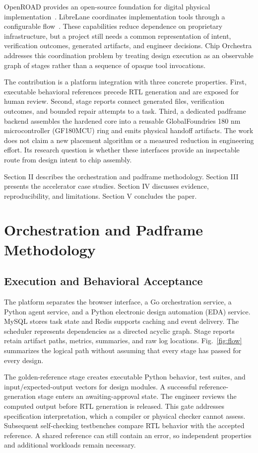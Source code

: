 ﻿\documentclass[conference,letterpaper]{IEEEtran}
\begin{document}
OpenROAD provides an open-source foundation for digital physical implementation~\cite{openroad}. LibreLane coordinates implementation tools through a configurable flow~\cite{librelane}. These capabilities reduce dependence on proprietary infrastructure, but a project still needs a common representation of intent, verification outcomes, generated artifacts, and engineer decisions. Chip Orchestra addresses this coordination problem by treating design execution as an observable graph of stages rather than a sequence of opaque tool invocations.

The contribution is a platform integration with three concrete properties. First, executable behavioral references precede RTL generation and are exposed for human review. Second, stage reports connect generated files, verification outcomes, and bounded repair attempts to a task. Third, a dedicated padframe backend assembles the hardened core into a reusable GlobalFoundries 180 nm microcontroller (GF180MCU) ring and emits physical handoff artifacts. The work does not claim a new placement algorithm or a measured reduction in engineering effort. Its research question is whether these interfaces provide an inspectable route from design intent to chip assembly.

Section II describes the orchestration and padframe methodology. Section III presents the accelerator case studies. Section IV discusses evidence, reproducibility, and limitations. Section V concludes the paper.

\section{Orchestration and Padframe Methodology}
\subsection{Execution and Behavioral Acceptance}
The platform separates the browser interface, a Go orchestration service, a Python agent service, and a Python electronic design automation (EDA) service. MySQL stores task state and Redis supports caching and event delivery. The scheduler represents dependencies as a directed acyclic graph. Stage reports retain artifact paths, metrics, summaries, and raw log locations. Fig.~\ref{fig:flow} summarizes the logical path without assuming that every stage has passed for every design.

The golden-reference stage creates executable Python behavior, test suites, and input/expected-output vectors for design modules. A successful reference-generation stage enters an awaiting-approval state. The engineer reviews the computed output before RTL generation is released. This gate addresses specification interpretation, which a compiler or physical checker cannot assess. Subsequent self-checking testbenches compare RTL behavior with the accepted reference. A shared reference can still contain an error, so independent properties and additional workloads remain necessary.
\end{document}
